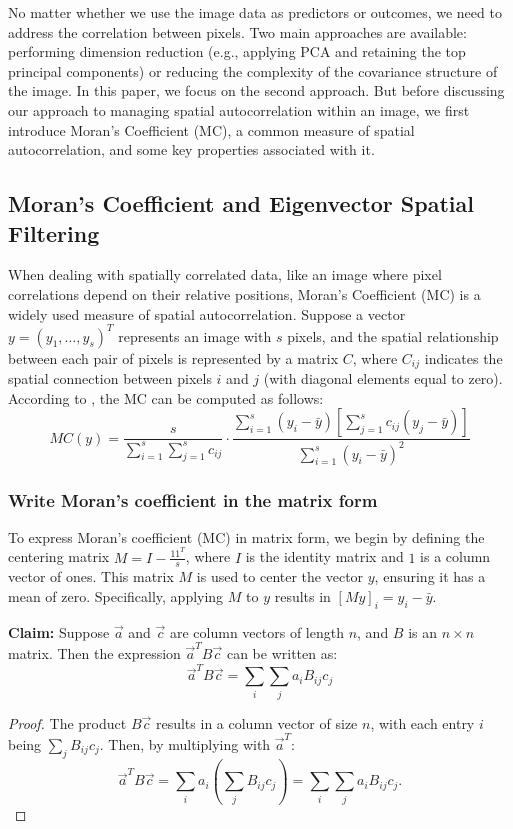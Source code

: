\documentclass[12pt]{article}
\begin{document}
No matter whether we use the image data as predictors or outcomes, we need to address the correlation between pixels. Two main approaches are available: performing dimension reduction (e.g., applying PCA and retaining the top principal components) or reducing the complexity of the covariance structure of the image. In this paper, we focus on the second approach. But before discussing our approach to managing spatial autocorrelation within an image, we first introduce Moran's Coefficient (MC), a common measure of spatial autocorrelation, and some key properties associated with it.


\subsection*{Moran's Coefficient and Eigenvector Spatial Filtering}

When dealing with spatially correlated data, like an image where pixel correlations depend on their relative positions, Moran’s Coefficient (MC) is a widely used measure of spatial autocorrelation. Suppose a vector \( y = (y_1, \ldots, y_s)^T \) represents an image with \( s \) pixels, and the spatial relationship between each pair of pixels is represented by a matrix \( C \), where \( C_{ij} \) indicates the spatial connection between pixels \( i \) and \( j \) (with diagonal elements equal to zero). According to \citet{griffith2014spatial}, the MC can be computed as follows:
\[
M C(y) = \frac{s}{\sum_{i=1}^s \sum_{j=1}^s c_{ij}} \cdot \frac{\sum_{i=1}^s \left(y_i - \bar{y} \right) \left[ \sum_{j=1}^s c_{ij} \left( y_j - \bar{y} \right) \right]}{\sum_{i=1}^s \left( y_i - \bar{y} \right)^2}
\]

\subsubsection*{Write Moran's coefficient in the matrix form}

To express Moran's coefficient (MC) in matrix form, we begin by defining the centering matrix \( M = I - \frac{1 1^T}{s} \), where \( I \) is the identity matrix and \( 1 \) is a column vector of ones. This matrix \( M \) is used to center the vector \( y \), ensuring it has a mean of zero. Specifically, applying \( M \) to \( y \) results in \( [M y]_i = y_i - \bar{y} \).

{\bf Claim:} Suppose \( \vec{a} \) and \( \vec{c} \) are column vectors of length \( n \), and \( B \) is an \( n \times n \) matrix. Then the expression \( \vec{a}^T B \vec{c} \) can be written as:
\[
  \vec{a}^T B \vec{c} = \sum_i \sum_j a_i B_{ij} c_j
\]
\begin{proof}
  The product \( B \vec{c} \) results in a column vector of size \( n \), with each entry \( i \) being \( \sum_j B_{ij} c_j \). Then, by multiplying with \( \vec{a}^T \):
  \[
    \vec{a}^T B \vec{c} = \sum_i a_i \left( \sum_j B_{ij} c_j \right) = \sum_i \sum_j a_i B_{ij} c_j.
  \]
\end{proof}
\end{document}
